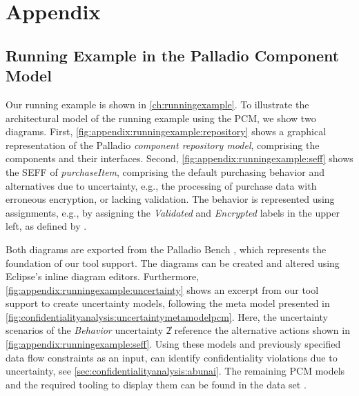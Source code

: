\part{Appendix}%
\label{ch:appendix}

\chapter{Running Example in the Palladio Component Model}%
\label{sec:appendix:runningexample}

Our running example is shown in \autoref{ch:runningexample}.
To illustrate the architectural model of the running example using the \acf{PCM}, we show two diagrams.
First, \autoref{fig:appendix:runningexample:repository} shows a graphical representation of the Palladio \emph{component repository model}, comprising the components and their interfaces.
Second, \autoref{fig:appendix:runningexample:seff} shows the \acf{SEFF} of \emph{purchaseItem}, comprising the default purchasing behavior and alternatives due to uncertainty, e.g., the processing of purchase data with erroneous encryption, or lacking validation.
The behavior is represented using assignments, e.g., by assigning the \emph{Validated} and \emph{Encrypted} labels in the upper left, as defined by \textcite{seifermann_identifying_2021}.

Both diagrams are exported from the Palladio Bench \cite{reussner_palladio_2024}, which represents the foundation of our tool support.
The diagrams can be created and altered using Eclipse's inline diagram editors.
Furthermore, \autoref{fig:appendix:runningexample:uncertainty} shows an excerpt from our tool support to create uncertainty models, following the meta model presented in \autoref{fig:confidentialityanalysis:uncertaintymetamodelpcm}.
Here, the uncertainty scenarios of the \emph{Behavior} uncertainty \U{2} reference the alternative actions shown in \autoref{fig:appendix:runningexample:seff}.
Using these models and previously specified data flow constraints \cite{hahner_modeling_2021,boltz_extensible_2024} as an input, \abunai can identify confidentiality violations due to uncertainty, see \autoref{sec:confidentialityanalysis:abunai}.
The remaining \ac{PCM} models and the required tooling to display them can be found in the data set \cite{dataset}.

